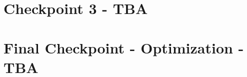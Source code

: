 \documentclass[11pt]{article}
\begin{document}
\pagebreak

\section{Checkpoint 3 - TBA}

\section{Final Checkpoint - Optimization - TBA}
%
%
%
%
%
\end{document}
